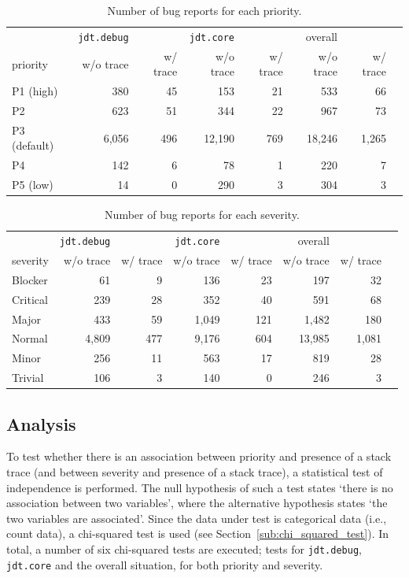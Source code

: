 \begin{table}[!ht]\footnotesize
	\centering
	\begin{tabular}{lrrrrrrr}
		\toprule		
		 & \texttt{jdt.debug} &  & \texttt{jdt.core} &  & overall & \\
		priority & w/o trace & w/ trace & w/o trace & w/ trace & w/o trace & w/ trace\\
		\midrule
		P1 (high) & 380 & 45 & 153 & 21 & 533 & 66\\
		P2 & 623 & 51 & 344 & 22 & 967 & 73\\
		P3 (default) & 6,056 & 496 & 12,190 & 769 & 18,246 & 1,265\\
		P4 & 142 & 6 & 78 & 1 & 220 & 7\\
		P5 (low) & 14 & 0 & 290 & 3 & 304 & 3\\
		\bottomrule
	\end{tabular} 
	\caption{Number of bug reports for each priority.}
	\label{tab:prio-counts}
\end{table}

\begin{table}[!ht]\footnotesize
	\centering
	\begin{tabular}{lrrrrrrr}
		\toprule		
		 & \texttt{jdt.debug} &  & \texttt{jdt.core} &  & overall & \\
		severity & w/o trace & w/ trace & w/o trace & w/ trace & w/o trace & w/ trace\\
		\midrule
		Blocker & 61 & 9 & 136 & 23 & 197 & 32\\
		Critical & 239 & 28 & 352 & 40 & 591 & 68\\
		Major & 433 & 59 & 1,049 & 121 & 1,482 & 180\\
		Normal & 4,809 & 477 & 9,176 & 604 & 13,985 & 1,081\\
		Minor & 256 & 11 & 563 & 17 & 819 & 28\\
		Trivial & 106 & 3 & 140 & 0 & 246 & 3\\
		\bottomrule
	\end{tabular} 
	\caption{Number of bug reports for each severity.}
	\label{tab:sev-counts}
\end{table}

\subsection{Analysis} %
To test whether there is an association between priority and presence of a stack trace (and between severity and presence of a stack trace), a statistical test of independence is performed. The null hypothesis of such a test states `there is no association between two variables', where the alternative hypothesis states `the two variables are associated'. Since the data under test is categorical data (i.e., count data), a chi-squared test is used (see Section~\ref{sub:chi_squared_test}). In total, a number of six chi-squared tests are executed; tests for \texttt{jdt.debug}, \texttt{jdt.core} and the overall situation, for both priority and severity. 


